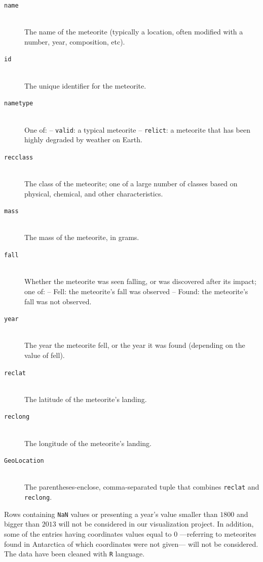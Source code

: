 \documentclass[10pt,conference,compsocconf]{IEEEtran}
\begin{document}
\begin{description}
\item[\texttt{name}] \ \\
  The name of the meteorite (typically a location, often modified with a number, year, composition, etc).
\item[\texttt{id}] \ \\
  The unique identifier for the meteorite.
\item[\texttt{nametype}] \ \\
  One of: -- \texttt{valid}: a typical meteorite -- \texttt{relict}: a meteorite that has been highly degraded by weather on Earth.
\item[\texttt{recclass}] \ \\
  The class of the meteorite; one of a large number of classes based on physical, chemical, and other characteristics.
\item[\texttt{mass}] \ \\
  The mass of the meteorite, in grams.
\item[\texttt{fall}] \ \\
   Whether the meteorite was seen falling, or was discovered after its impact; one of: -- Fell: the meteorite's fall was observed -- Found: the meteorite's fall was not observed.
\item[\texttt{year}] \ \\
  The year the meteorite fell, or the year it was found (depending on the value of fell).
\item[\texttt{reclat}] \ \\
  The latitude of the meteorite's landing.
\item[\texttt{reclong}] \ \\
  The longitude of the meteorite's landing.
\item[\texttt{GeoLocation}] \ \\
  The parentheses-enclose, comma-separated tuple that combines \texttt{reclat} and \texttt{reclong}.
\end{description}

Rows containing \texttt{NaN} values or presenting a year’s value smaller than $1800$ and bigger than $2013$ will not be considered in our visualization project. In addition, some of the entries having coordinates values equal to $0$ ---referring to meteorites found in Antarctica of which coordinates were not given--- will not be considered. The data have been cleaned with \texttt{R} language.

\end{document}
